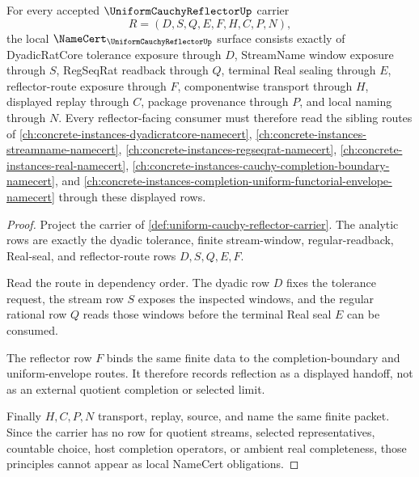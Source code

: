 \begin{theorem}
\label{thm:uniform-cauchy-reflector-namecert-obligations}
For every accepted $\UniformCauchyReflectorUp$ carrier
$$
R=(D,S,Q,E,F,H,C,P,N),
$$
the local $\NameCert_{\UniformCauchyReflectorUp}$ surface consists exactly of DyadicRatCore tolerance exposure through $D$, StreamName window exposure through $S$, RegSeqRat readback through $Q$, terminal Real sealing through $E$, reflector-route exposure through $F$, componentwise transport through $H$, displayed replay through $C$, package provenance through $P$, and local naming through $N$. Every reflector-facing consumer must therefore read the sibling routes of \autoref{ch:concrete-instances-dyadicratcore-namecert}, \autoref{ch:concrete-instances-streamname-namecert}, \autoref{ch:concrete-instances-regseqrat-namecert}, \autoref{ch:concrete-instances-real-namecert}, \autoref{ch:concrete-instances-cauchy-completion-boundary-namecert}, and \autoref{ch:concrete-instances-completion-uniform-functorial-envelope-namecert} through these displayed rows.
\end{theorem}
\begin{proof}
Project the carrier of \autoref{def:uniform-cauchy-reflector-carrier}. The analytic rows are exactly the dyadic tolerance, finite stream-window, regular-readback, Real-seal, and reflector-route rows $D,S,Q,E,F$.

Read the route in dependency order. The dyadic row $D$ fixes the tolerance request, the stream row $S$ exposes the inspected windows, and the regular rational row $Q$ reads those windows before the terminal Real seal $E$ can be consumed.

The reflector row $F$ binds the same finite data to the completion-boundary and uniform-envelope routes. It therefore records reflection as a displayed handoff, not as an external quotient completion or selected limit.

Finally $H,C,P,N$ transport, replay, source, and name the same finite packet. Since the carrier has no row for quotient streams, selected representatives, countable choice, host completion operators, or ambient real completeness, those principles cannot appear as local NameCert obligations.
\end{proof}

